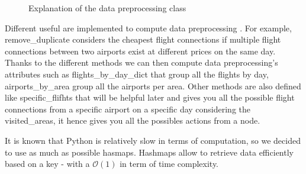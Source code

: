 \begin{figure}[!ht]
    \caption{Explanation of the data preprocessing class}
    \label{fig:data_preprocessing_class}
\end{figure}


Different useful  are implemented to compute data preprocessing . For example, remove\_duplicate considers the cheapest flight connections if multiple flight connections between two airports exist at different prices on the same day.
Thanks to the different methods we can then compute data preprocessing's attributes such as flights\_by\_day\_dict that group all the flights by day, airports\_by\_area group all the airports per area.
Other methods are also defined like specific\_flifhts that will be helpful later and gives you all the possible flight connections from a specific airport on a specific day considering the visited\_areas, it hence gives you all the possibles actions from a node.


It is known that Python is relatively slow in terms of computation, so we decided to use as much as possible hasmaps.
Hashmaps allow to retrieve data efficiently based on a key - with a $\mathcal{O}(1)$ in term of time complexity.


\newpage
